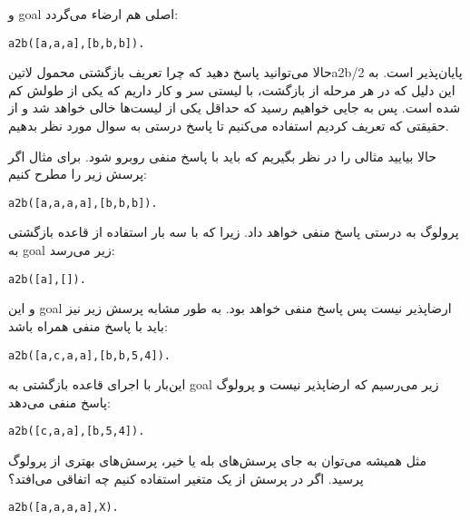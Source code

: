 و goal اصلی هم ارضاء می‌گردد:

\begin{latin}
\begin{lstlisting}
a2b([a,a,a],[b,b,b]).
\end{lstlisting}
\end{latin}

حالا می‌توانید پاسخ دهید که چرا تعریف بازگشتی محمول ‌لاتین{a2b/2} پایان‌پذیر است. به این دلیل که در هر مرحله از بازگشت، با لیستی سر و کار داریم که یکی از طولش کم شده است. پس به جایی خواهیم رسید که حداقل یکی از لیست‌ها خالی خواهد شد و از حقیقتی که تعریف کردیم استفاده می‌کنیم تا پاسخ درستی به سوال مورد نظر بدهیم.

حالا بیایید مثالی را در نظر بگیریم که باید با پاسخ منفی روبرو شود. برای مثال اگر پرسش زیر را مطرح کنیم:

\begin{latin}
\begin{lstlisting}
a2b([a,a,a,a],[b,b,b]).
\end{lstlisting}
\end{latin}

پرولوگ به درستی پاسخ منفی خواهد داد. زیرا که با سه بار استفاده از قاعده بازگشتی به goal زیر می‌رسد:

\begin{latin}
\begin{lstlisting}
a2b([a],[]).
\end{lstlisting}
\end{latin}

و این goal ارضاپذیر نیست پس پاسخ منفی خواهد بود. به طور مشابه پرسش زیر نیز باید با پاسخ منفی همراه باشد:

\begin{latin}
\begin{lstlisting}
a2b([a,c,a,a],[b,b,5,4]).
\end{lstlisting}
\end{latin}

این‌بار با اجرای قاعده بازگشتی به goal زیر می‌رسیم که ارضاپذیر نیست و پرولوگ پاسخ منفی می‌دهد:

\begin{latin}
\begin{lstlisting}
a2b([c,a,a],[b,5,4]).
\end{lstlisting}
\end{latin}

مثل همیشه می‌توان به جای پرسش‌های بله یا خیر، پرسش‌های بهتری از پرولوگ پرسید. اگر در پرسش از یک متغیر استفاده کنیم چه اتفاقی می‌افتد؟

\begin{latin}
\begin{lstlisting}
a2b([a,a,a,a],X).
\end{lstlisting}
\end{latin}

